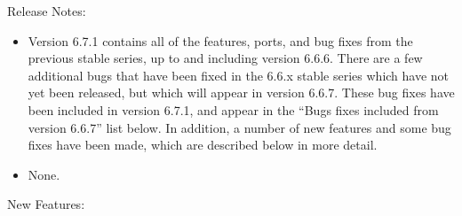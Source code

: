 \noindent Release Notes:

\begin{itemize}

\item Version 6.7.1 contains all of the features, ports, and bug fixes
  from the previous stable series, up to and including version 6.6.6.
  There are a few additional bugs that have been fixed in the 6.6.x
  stable series which have not yet been released, but which will
  appear in version 6.6.7.
  These bug fixes have been included in version 6.7.1, and appear in
  the ``Bugs fixes included from version 6.6.7'' list below.
  In addition, a number of new features and some bug fixes have been
  made, which are described below in more detail.

\item None.

\end{itemize}


\noindent New Features:


